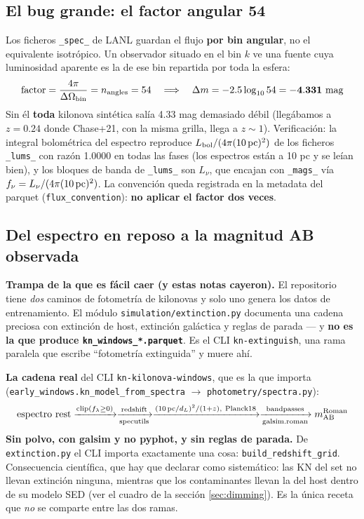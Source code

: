 \documentclass[11pt,a4paper]{article}
\newcommand{\code}[1]{\texttt{\small #1}}
\newlength{\examenpad}
\newenvironment{examen}
  {\par\medskip\noindent
   \begin{lrbox}{\examenbox}%
   \begin{minipage}{\dimexpr\linewidth-2\examenpad}\small}
  {\end{minipage}%
   \end{lrbox}%
   {\setlength{\fboxsep}{\examenpad}\colorbox{boxgray}{\usebox{\examenbox}}}%
   \par\medskip}
\begin{document}
\subsection{El bug grande: el factor angular 54}
Los ficheros \code{\_spec\_} de LANL guardan el flujo \textbf{por bin angular}, no el equivalente
isotrópico. Un observador situado en el bin $k$ ve una fuente cuya luminosidad aparente es la de ese
bin repartida por toda la esfera:
\begin{equation}
\text{factor} = \frac{4\pi}{\Delta\Omega_{\rm bin}} = n_{\rm angles} = 54
\quad\Longrightarrow\quad
\Delta m = -2.5\log_{10} 54 = \mathbf{-4.331\ \text{mag}}
\end{equation}
Sin él \textbf{toda} kilonova sintética salía 4.33 mag demasiado débil (llegábamos a $z=0.24$ donde
Chase+21, con la misma grilla, llega a $z\sim1$). Verificación: la integral bolométrica del espectro
reproduce $L_{\rm bol}/(4\pi(10\,\text{pc})^2)$ de los ficheros \code{\_lums\_} con razón 1.0000 en
todas las fases (los espectros están a 10 pc y se leían bien), y los bloques de banda de
\code{\_lums\_} son $L_\nu$, que encajan con \code{\_mags\_} vía $f_\nu = L_\nu/(4\pi(10\,{\rm
pc})^2)$. La convención queda registrada en la metadata del parquet
(\code{flux\_convention}): \textbf{no aplicar el factor dos veces}.

\subsection{Del espectro en reposo a la magnitud AB observada}
\label{sec:cadena-lanl}

\begin{examen}
\textbf{Trampa de la que es fácil caer (y estas notas cayeron).} El repositorio tiene \emph{dos}
caminos de fotometría de kilonovas y solo uno genera los datos de entrenamiento. El módulo
\code{simulation/extinction.py} documenta una cadena preciosa con extinción de host, extinción
galáctica y reglas de parada --- y \textbf{no es la que produce \code{kn\_windows\_*.parquet}}. Es
el CLI \code{kn-extinguish}, una rama paralela que escribe ``fotometría extinguida'' y muere ahí.
\end{examen}

\noindent\textbf{La cadena real} del CLI \code{kn-kilonova-windows}, que es la que importa
(\code{early\_windows.kn\_model\_from\_spectra} $\to$ \code{photometry/spectra.py}):
\begin{equation}
\text{espectro rest} \xrightarrow{\text{clip}(f_\lambda \ge 0)}
\xrightarrow[\text{specutils}]{\text{redshift}}
\xrightarrow{(10\,\text{pc}/d_L)^2/(1+z),\ \text{Planck18}}
\xrightarrow[\text{galsim.roman}]{\text{bandpasses}} m_{\rm AB}^{\rm Roman}
\end{equation}
\textbf{Sin polvo, con galsim y no pyphot, y sin reglas de parada.} De \code{extinction.py} el CLI
importa exactamente una cosa: \code{build\_redshift\_grid}. Consecuencia científica, que hay que
declarar como sistemático: las KN del set no llevan extinción ninguna, mientras que los
contaminantes llevan la del host dentro de su modelo SED (ver el cuadro de la sección
\ref{sec:dimming}). Es la única receta que \emph{no} se comparte entre las dos ramas.
\end{document}
